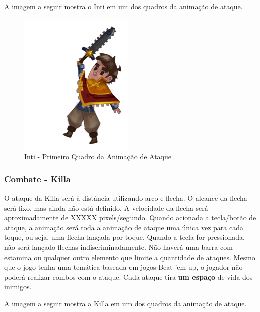 \documentclass[12pt]{article}
\begin{document}
A imagem a seguir mostra o Inti em um dos quadros da animação de ataque.

\begin{figure}[!htb]
    \centering
    \includegraphics[scale=0.8]{attack_00.png}
    \caption{Inti - Primeiro Quadro da Animação de Ataque}
    \label{fig:inti_attack}
\end{figure}

\subsubsection{Combate - Killa}
O ataque da Killa será à distância utilizando arco e flecha. O alcance da flecha
será fixo, mas ainda não está definido. A velocidade da flecha será aproximadamente
de XXXXX pixels/segundo. Quando acionada a tecla/botão de ataque, a animação será
toda a animação de ataque uma única vez para cada toque, ou seja, uma flecha
lançada por toque. Quando a tecla for pressionada, não será lançado flechas
indiscriminadamente. Não haverá uma barra com estamina ou qualquer outro
elemento que limite a quantidade de ataques. Mesmo que o jogo tenha uma temática
baseada em jogos Beat 'em up, o jogador não poderá realizar combos com o ataque.
Cada ataque tira {\bf um espaço} de vida dos inimigos.

A imagem a seguir mostra a Killa em um dos quadros da animação de ataque.
\end{document}
